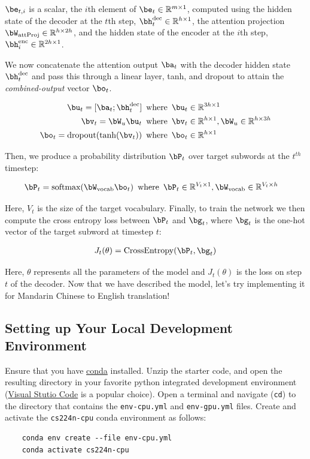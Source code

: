 $\be_{t, i}$ is a scalar, the $i$th element of $\be_{t} \in \Real^{m \times 1}$, computed using the hidden state of the decoder at the $t$th step, $\hdec_t \in \Real^{h \times 1}$, the attention projection $\bW_{\text{attProj}} \in \Real^{h \times 2h}$, and the hidden state of the encoder at the $i$th step, $\henc_i \in \Real^{2h \times 1}$.

We now concatenate the attention output $\ba_t$ with the decoder hidden state $\hdec_t$ and pass this through a linear layer, tanh, and dropout to attain the \textit{combined-output} vector $\bo_{t}$.

\begin{align}   
    \bu_{t} = [\ba_{t}; \hdec_t] \enspace &\text{where} \enspace \bu_t \in  \Real^{3h \times 1} \\
    \bv_t = \bW_{u}\bu_t \enspace &\text{where} \enspace \bv_t \in \Real^{h \times 1}, \bW_{u} \in \Real^{h \times 3h}\\
    \bo_t = \text{dropout}(\text{tanh}(\bv_t)) \enspace &\text{where} \enspace \bo_t \in \Real^{h \times 1}
\end{align}

Then, we produce a probability distribution $\bP_t$ over target subwords at the $t^{th}$ timestep:

\begin{align}
    \bP_t = \text{softmax}(\bW_{\text{vocab}}\bo_{t}) \enspace &\text{where} \enspace \bP_t \in \Real^{V_{t} \times 1}, \bW_{\text{vocab}} \in \Real^{V_{t} \times h}
\end{align}

Here, $V_{t}$ is the size of the target vocabulary. Finally, to train the network we then compute the cross entropy loss between $\bP_t$ and $\bg_{t}$, where $\bg_{t}$ is the one-hot vector of the target subword at timestep $t$:

\begin{align}
    J_t(\theta) = \mathrm{CrossEntropy}(\bP_t,\bg_{t})
\end{align}

Here, $\theta$ represents all the parameters of the model and $J_t(\theta)$ is the loss on step $t$ of the decoder.
Now that we have described the model, let's try implementing it for Mandarin Chinese to English translation!


\subsection*{Setting up Your Local Development Environment}
Ensure that you have \href{https://docs.anaconda.com/free/miniconda/index.html}{conda} installed.
Unzip the starter code, and open the resulting directory in your favorite python integrated development environment (\href{https://code.visualstudio.com/}{Visual Stutio Code} is a popular choice). Open a terminal and navigate (\texttt{cd}) to the directory that contains the \texttt{env-cpu.yml} and \texttt{env-gpu.yml} files. Create and activate the \texttt{cs224n-cpu} conda environment as follows:
\begin{lstlisting}
    conda env create --file env-cpu.yml
    conda activate cs224n-cpu
\end{lstlisting}


